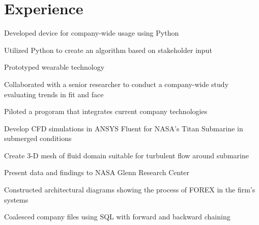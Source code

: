\documentclass[]{deedy-resume-openfont}
\begin{document}
\begin{minipage}[t]{0.66\textwidth} 


\section{Experience}

\vspace{\topsep} %
\begin{tightemize}
\item Developed device for company-wide usage using Python
\item Utilized Python to create an algorithm based on stakeholder input
\item Prototyped wearable technology
\item Collaborated with a senior researcher to conduct a company-wide study evaluating trends in fit and face
\item Piloted a progoram that integrates current company technologies
\end{tightemize}
\sectionsep

\begin{tightemize}
\item Develop CFD simulations in ANSYS Fluent for NASA's Titan Submarine in submerged conditions
\item Create 3-D mesh of fluid domain suitable for turbulent flow around submarine
\item Present data and findings to NASA Glenn Research Center
\end{tightemize}
\sectionsep

\begin{tightemize}
\item Constructed architectural diagrams showing the process of FOREX in the firm's systems
\item Coalesced company files using SQL with forward and backward chaining
\end{tightemize}
\sectionsep


\end{minipage}
\end{document}

